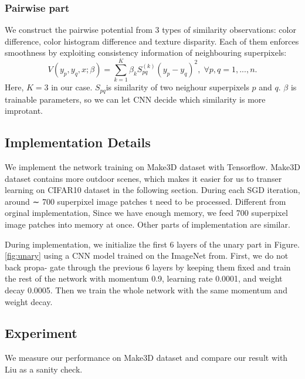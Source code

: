 \documentclass[10pt,twocolumn,letterpaper]{article}
\begin{document}
\subsubsection{Pairwise part}
We construct the pairwise potential from 3 types of similarity observations: 
color difference, color histogram difference and texture 
disparity\cite{ojala1994performance}. Each of them enforces smoothness by 
exploiting consistency information of neighbouring superpixels:
\begin{equation}
 \label{eq:pairwise}
V(y_{p}, y_{q}, x; \beta) = \sum_{k=1}^K \beta_k S_{pq}^{(k)}(y_p - y_q)^2, 
\;\forall p,q=1,...,n.
\end{equation}
Here, $K=3$ in our case. $S_{pq}$is similarity of two neighour superpixels $p$ 
and $q$. $\beta$ is trainable parameters, so we can let CNN decide which 
similarity is more improtant. 

\subsection{Implementation Details}
We implement the network training on Make3D\cite{saxena2005learning} dataset 
with Tensorflow\cite{tensorflow2015-whitepaper}. Make3D dataset contains 
more outdoor scenes, which makes it easier for us to transer learning on 
CIFAR10 dataset in the following section. During each SGD iteration, 
around ∼ 700 superpixel image patches t need to be processed. Different from 
orginal implementation\cite{liu2015deep}, Since we have enough memory, we feed 
700 superpixel image patches into memory at once. Other parts of implementation 
are similar.

During implementation, we initialize the first 6 layers of the unary part in 
Figure.\ref{fig:unary} using a CNN model trained on the ImageNet 
from\cite{chatfield2014return}. First, we do not back propa- gate through the 
previous 6 layers by keeping them fixed and train the rest of the network
with momentum 0.9, learning rate 0.0001, and weight decay 
0.0005. Then we train the whole network with the same momentum and weight decay.

\subsection{Experiment}
We measure our performance on Make3D dataset and compare our result with Liu 
\etal \cite{liu2015deep} as a sanity check. 
\end{document}
